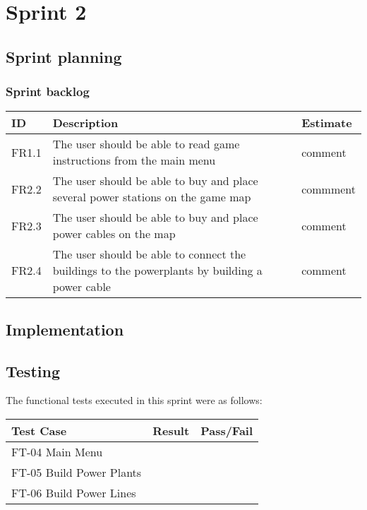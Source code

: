 \section{Sprint 2}

\subsection{Sprint planning}
\subsubsection{Sprint backlog}
\begin{tabular}{| p{1cm} | p{8cm} | p{3cm} |}
	\hline
	\rowcolor{gray}
	ID & Description & Estimate \\ \hline
	FR1.1 & The user should be able to read game instructions from the main menu & comment \\ \hline
	FR2.2 & The user should be able to buy and place several power stations on the game map 
	& commment \\ \hline
	FR2.3 & The user should be able to buy and place power cables on the map & comment \\ \hline
	FR2.4 & The user should be able to connect the buildings to the powerplants by 
	building a power cable & comment \\ \hline
\end{tabular}
\subsection{Implementation}


\subsection{Testing}

The functional tests executed in this sprint were as follows:


\begin{tabular}{| l | l | l |}
	\hline
	\rowcolor{lightgray}
	{\bf Test Case} & {\bf Result} & {\bf Pass/Fail} \\ \hline
  	FT-04 Main Menu & & \\ \hline
	FT-05 Build Power Plants & & \\ \hline
	FT-06 Build Power Lines & & \\ \hline
\end{tabular}

